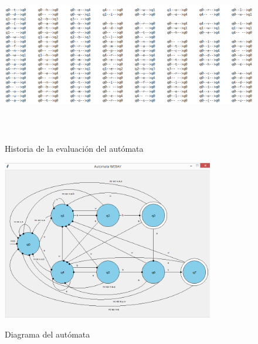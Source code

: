 \begin{figure}[H]
\includegraphics[width=\textwidth, height=7cm]{HistoriaWebayA.png}
\label{fig:manualnuevoconteo_alfabeto}
\caption{Historia de la evaluaci\'on del aut\'omata}
\end{figure}

\begin{figure}[H]
\includegraphics[width=\textwidth, height=7cm]{DiagramaWebay.png}
\label{fig:DiagramaWebay}
\caption{Diagrama del aut\'omata}
\end{figure}

\newpage

